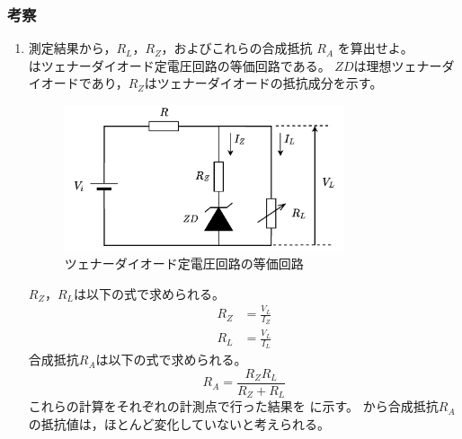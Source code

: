 \subsubsection{考察}
	\begin{enumerate}
		\item 測定結果から，$R_L$，$R_Z$，およびこれらの合成抵抗 $R_A$ を算出せよ。\\
  
		 はツェナーダイオード定電圧回路の等価回路である。
		$ZD$は理想ツェナーダイオードであり，$R_Z$はツェナーダイオードの抵抗成分を示す。
		
				\begin{figure}[!h]
					\centering
					\includegraphics[width=8.2cm]{./pdfs/risou2.pdf}
					\caption{ツェナーダイオード定電圧回路の等価回路}
					\label{fig:risou2}
				\end{figure}
		
		$R_Z$，$R_L$は以下の式で求められる。
		\begin{align}
			R_Z &= \frac{V_L}{I_Z} \nonumber \\
			R_L &= \frac{V_L}{I_L} \nonumber
		\end{align}
		合成抵抗$R_A$は以下の式で求められる。
		\begin{equation}
			R_A = \frac{R_Z R_L}{R_Z + R_L} \nonumber
		\end{equation}
		これらの計算をそれぞれの計測点で行った結果を に示す。
		 から合成抵抗$R_A$の抵抗値は，ほとんど変化していないと考えられる。


\end{enumerate}
